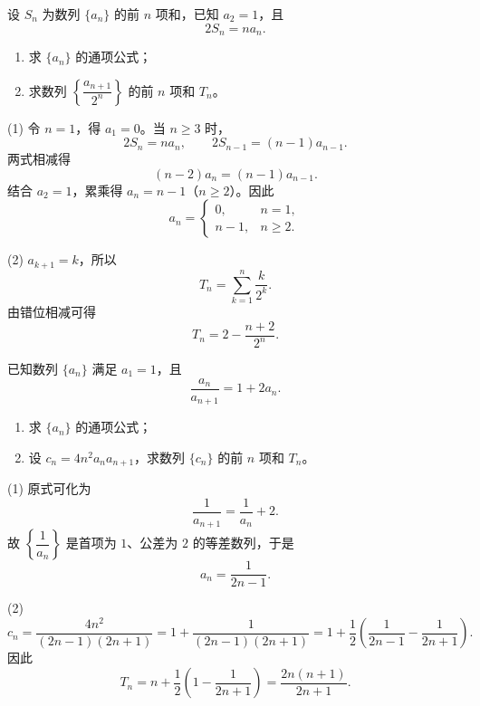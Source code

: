 \documentclass[zihao=-4]{exam-zh}
\begin{document}
\begin{question}[points=12]
设 $S_n$ 为数列 $\{a_n\}$ 的前 $n$ 项和，已知 $a_2=1$，且
\[
 2S_n=na_n.
\]
\begin{enumerate}
  \item 求 $\{a_n\}$ 的通项公式；
  \item 求数列 $\left\{\dfrac{a_{n+1}}{2^n}\right\}$ 的前 $n$ 项和 $T_n$。
\end{enumerate}
\begin{solution}
(1) 令 $n=1$，得 $a_1=0$。当 $n\ge3$ 时，
\[
 2S_n=na_n,\qquad 2S_{n-1}=(n-1)a_{n-1}.
\]
两式相减得
\[
 (n-2)a_n=(n-1)a_{n-1}.
\]
结合 $a_2=1$，累乘得 $a_n=n-1$（$n\ge2$）。因此
\[
 \boxed{a_n=\begin{cases}0,&n=1,\\n-1,&n\ge2.
 \end{cases}}
\]

(2) $a_{k+1}=k$，所以
\[
 T_n=\sum_{k=1}^{n}\frac{k}{2^k}.
\]
由错位相减可得
\[
 \boxed{T_n=2-\frac{n+2}{2^n}}.
\]
\end{solution}
\end{question}

\begin{question}[points=12]
已知数列 $\{a_n\}$ 满足 $a_1=1$，且
\[
 \frac{a_n}{a_{n+1}}=1+2a_n.
\]
\begin{enumerate}
  \item 求 $\{a_n\}$ 的通项公式；
  \item 设 $c_n=4n^2a_na_{n+1}$，求数列 $\{c_n\}$ 的前 $n$ 项和 $T_n$。
\end{enumerate}
\begin{solution}
(1) 原式可化为
\[
 \frac1{a_{n+1}}=\frac1{a_n}+2.
\]
故 $\left\{\dfrac1{a_n}\right\}$ 是首项为 $1$、公差为 $2$ 的等差数列，于是
\[
 \boxed{a_n=\frac1{2n-1}}.
\]

(2)
\[
 c_n=\frac{4n^2}{(2n-1)(2n+1)}
 =1+\frac1{(2n-1)(2n+1)}
 =1+\frac12\left(\frac1{2n-1}-\frac1{2n+1}\right).
\]
因此
\[
 T_n=n+\frac12\left(1-\frac1{2n+1}\right)
 =\boxed{\frac{2n(n+1)}{2n+1}}.
\]
\end{solution}
\end{question}
\end{document}
